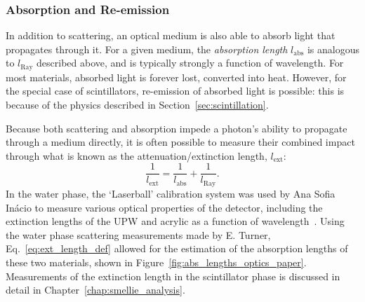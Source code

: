 
\subsubsection{Absorption and Re-emission}
In addition to scattering, an optical medium is also able to absorb light that propagates through it. For a given medium, the \textit{absorption length} $l_{\mathrm{abs}}$ is analogous to $l_{\mathrm{Ray}}$ described above, and is typically strongly a function of wavelength. For most materials, absorbed light is forever lost, converted into heat. However, for the special case of scintillators, re-emission of absorbed light is possible: this is because of the physics described in Section~\ref{sec:scintillation}.

Because both scattering and absorption impede a photon's ability to propagate through a medium directly, it is often possible to measure their combined impact through what is known as the attenuation/extinction length, $l_{\mathrm{ext}}$:
\begin{equation}\label{eq:ext_length_def}
    \frac{1}{l_{\mathrm{ext}}} = \frac{1}{l_{\mathrm{abs}}} + \frac{1}{l_{\mathrm{Ray}}}.
\end{equation}
In the water phase, the `Laserball' calibration system was used by Ana Sofia In\'{a}cio to measure various optical properties of the detector, including the extinction lengths of the UPW and acrylic as a function of wavelength~\cite{andersonOpticalCalibrationSNO2021,inacioDataAnalysisWater2022}. Using the water phase scattering measurements made by E. Turner, Eq.~\ref{eq:ext_length_def} allowed for the estimation of the absorption lengths of these two materials, shown in Figure~\ref{fig:abs_lengths_optics_paper}. Measurements of the extinction length in the scintillator phase is discussed in detail in Chapter~\ref{chap:smellie_analysis}.

